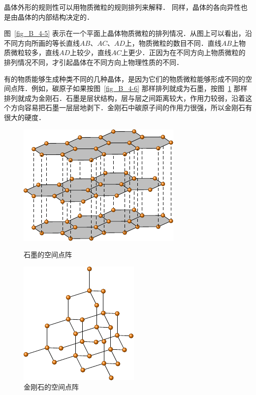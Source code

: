 晶体外形的规则性可以用物质微粒的规则排列来解释．
同样，晶体的各向异性也是由晶体的内部结构决定的．


图~\ref{fig_B_4-5} 表示在一个平面上晶体物质微粒的排列情况．从图上可以看出，沿不同方向所画的等长直线$AB$、$AC$、$AD$上，物质微粒的数目不同．直线$AB$上物质微粒较多，直线$AD$上较少，直线$AC$上更少．正因为在不同方向上物质微粒的排列情况不同，才引起晶体在不同方向上物理性质的不同．

有的物质能够生成种类不同的几种晶体，是因为它们的物质微粒能够形成不同的空间点阵．例如，碳原子如果按图~\ref{fig_B_4-6} 那样排列就成为石墨，按图~\ref{fig_B_4-7} 那样排列就成为金刚石．石墨是层状结构，层与层之间距离较大，作用力较弱，沿着这个方向容易把石墨一层层地剥下．金刚石中碳原子间的作用力很强，所以金刚石有很大的硬度．
\begin{figure}[htbp]
    \centering
    \begin{minipage}[t]{0.45\textwidth}
        \centering
        \includegraphics{fig/B/4-6.pdf}
        \caption{石墨的空间点阵}\label{fig_B_4-6}
    \end{minipage}
    \hfil
    \begin{minipage}[t]{0.45\textwidth}
        \centering
        \includegraphics{fig/B/4-7.pdf}
        \caption{金刚石的空间点阵}\label{fig_B_4-7}
    \end{minipage}
\end{figure}


